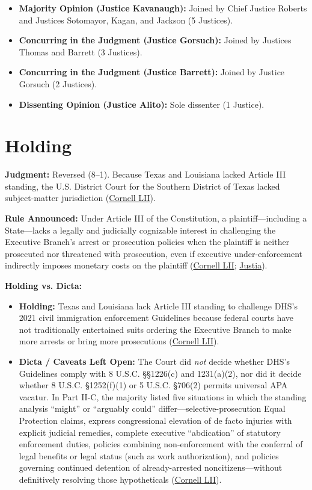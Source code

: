 \documentclass[12pt]{article}
\begin{document}
\begin{itemize}
\item \textbf{Majority Opinion (Justice Kavanaugh):} Joined by Chief Justice Roberts and Justices Sotomayor, Kagan, and Jackson (5 Justices).
\item \textbf{Concurring in the Judgment (Justice Gorsuch):} Joined by Justices Thomas and Barrett (3 Justices).
\item \textbf{Concurring in the Judgment (Justice Barrett):} Joined by Justice Gorsuch (2 Justices).
\item \textbf{Dissenting Opinion (Justice Alito):} Sole dissenter (1 Justice).
\end{itemize}

\section{Holding}

\textbf{Judgment:} Reversed (8--1). Because Texas and Louisiana lacked Article III standing, the U.S. District Court for the Southern District of Texas lacked subject-matter jurisdiction (\href{https://www.law.cornell.edu/supremecourt/text/22-58}{Cornell LII}).

\textbf{Rule Announced:} Under Article III of the Constitution, a plaintiff---including a State---lacks a legally and judicially cognizable interest in challenging the Executive Branch's arrest or prosecution policies when the plaintiff is neither prosecuted nor threatened with prosecution, even if executive under-enforcement indirectly imposes monetary costs on the plaintiff (\href{https://www.law.cornell.edu/supremecourt/text/22-58}{Cornell LII}; \href{https://supreme.justia.com/cases/federal/us/599/22-58/}{Justia}).

\textbf{Holding vs. Dicta:}
\begin{itemize}
\item \textbf{Holding:} Texas and Louisiana lack Article III standing to challenge DHS's 2021 civil immigration enforcement Guidelines because federal courts have not traditionally entertained suits ordering the Executive Branch to make more arrests or bring more prosecutions (\href{https://www.law.cornell.edu/supremecourt/text/22-58}{Cornell LII}).
\item \textbf{Dicta / Caveats Left Open:} The Court did \textit{not} decide whether DHS's Guidelines comply with 8 U.S.C. \S\S 1226(c) and 1231(a)(2), nor did it decide whether 8 U.S.C. \S 1252(f)(1) or 5 U.S.C. \S 706(2) permits universal APA vacatur. In Part II-C, the majority listed five situations in which the standing analysis ``might'' or ``arguably could'' differ---selective-prosecution Equal Protection claims, express congressional elevation of de facto injuries with explicit judicial remedies, complete executive ``abdication'' of statutory enforcement duties, policies combining non-enforcement with the conferral of legal benefits or legal status (such as work authorization), and policies governing continued detention of already-arrested noncitizens---without definitively resolving those hypotheticals (\href{https://www.law.cornell.edu/supremecourt/text/22-58}{Cornell LII}).
\end{itemize}
\end{document}
